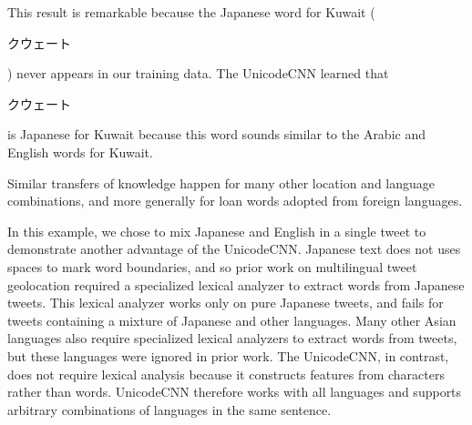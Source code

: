 \documentclass[sigconf,anonymous,review,10pt]{acmart}
\newcommand{\defn}[1]{\textit{#1}}
\newcommand{\ignore}[1]{}
\newcommand{\fixme}[1]{\textcolor{red}{\textbf{FIXME:} {#1}}}
\begin{document}
\begin{description}
\noindent

\noindent
This result is remarkable because the Japanese word for Kuwait (\begin{CJK}{UTF8}{min}クウェート\end{CJK}) never appears in our training data.
The UnicodeCNN learned that \begin{CJK}{UTF8}{min}クウェート\end{CJK} is Japanese for Kuwait because this word sounds similar to the Arabic and English words for Kuwait.
    \ignore{
Furthermore, if we misspell the Japanese word for Kuwait (for example as \begin{CJK}{UTF8}{min}ウェート\end{CJK}),
then the UnicodeCNN still understands that the location referred to is Kuwait.
The model's output in this case is
\noindent
}
\noindent
Similar transfers of knowledge happen for many other location and language combinations,
and more generally for loan words adopted from foreign languages.

In this example, we chose to mix Japanese and English in a single tweet to demonstrate another advantage of the UnicodeCNN.
Japanese text does not uses spaces to mark word boundaries, 
and so prior work on multilingual tweet geolocation \citep{han2014text} required a specialized lexical analyzer to extract words from Japanese tweets.
This lexical analyzer works only on pure Japanese tweets,
and fails for tweets containing a mixture of Japanese and other languages.
Many other Asian languages also require specialized lexical analyzers to extract words from tweets,
but these languages were ignored in prior work.
The UnicodeCNN, in contrast, does not require lexical analysis because it constructs features from characters rather than words.
UnicodeCNN therefore works with all languages and supports arbitrary combinations of languages in the same sentence.


\end{description}
\end{document}
